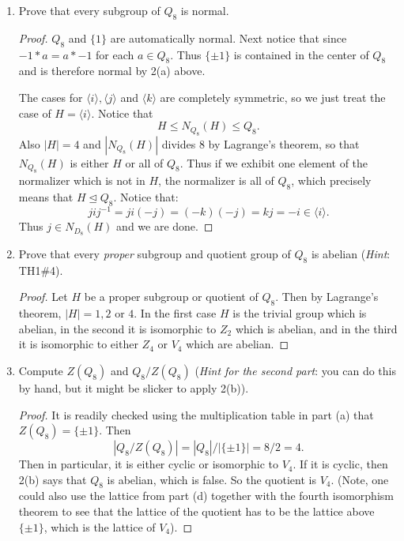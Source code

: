 \documentclass[11pt]{article}
\newcommand{\la}{\langle}
\newcommand{\ra}{\rangle}
\begin{document}
\begin{enumerate}
\begin{enumerate}
\begin{proof}
\[\begin{tikzcd}
        \la i\ra & \la j\ra & \la k\ra\\
        & \{\pm1\}\ar[u,dash]\ar[ur,dash]\ar[ul,dash]\ar[d,dash] &\\
        &\{1\}&
      \end{tikzcd}
      \]\
    \end{proof}
    \item Prove that every subgroup of $Q_8$ is normal.
    \begin{proof}
      $Q_8$ and $\{1\}$ are automatically normal.  Next notice that since $-1*a = a*-1$ for each $a\in Q_8$.  Thus $\{\pm1\}$ is contained in the center of $Q_8$ and is therefore normal by 2(a) above.

      The cases for $\la i\ra, \la j\ra$ and $\la k\ra$ are completely symmetric, so we just treat the case of $H = \la i\ra$.  Notice that
      \[H\le N_{Q_8}(H)\le Q_8.\]
      Also $|H| = 4$ and $|N_{Q_8}(H)|$ divides 8 by Lagrange's theorem, so that $N_{Q_8}(H)$ is either $H$ or all of $Q_8$.  Thus if we exhibit one element of the normalizer which is not in $H$, the normalizer is all of $Q_8$, which precisely means that $H\unlhd Q_8$.  Notice that:
      \[jij^{-1} = ji(-j) = (-k)(-j) = kj = -i\in\la i\ra.\]
      Thus $j\in N_{D_8}(H)$ and we are done.
    \end{proof}
    \item Prove that every \textit{proper} subgroup and quotient group of $Q_8$ is abelian (\textit{Hint}: TH1\#4).
    \begin{proof}
      Let $H$ be a proper subgroup or quotient of $Q_8$.  Then by Lagrange's theorem, $|H| = 1,2$ or $4$.  In the first case $H$ is the trivial group which is abelian, in the second it is isomorphic to $Z_2$ which is abelian, and in the third it is isomorphic to either $Z_4$ or $V_4$ which are abelian.
    \end{proof}
    \item Compute $Z(Q_8)$ and $Q_8/Z(Q_8)$ (\textit{Hint for the second part}: you can do this by hand, but it might be slicker to apply 2(b)).
    \begin{proof}
      It is readily checked using the multiplication table in part (a) that $Z(Q_8) = \{\pm1\}$.  Then
      \[|Q_8/Z(Q_8)| = |Q_8|/|\{\pm1\}| = 8/2 = 4.\]
      Then in particular, it is either cyclic or isomorphic to $V_4$.  If it is cyclic, then 2(b) says that $Q_8$ is abelian, which is false.  So the quotient is $V_4$.  (Note, one could also use the lattice from part (d) together with the fourth isomorphism theorem to see that the lattice of the quotient has to be the lattice above $\{\pm1\}$, which is the lattice of $V_4$).
    \end{proof}


\end{enumerate}
\end{enumerate}
\end{document}
